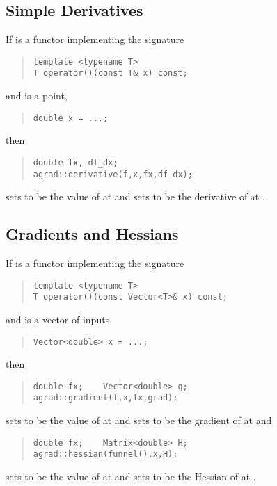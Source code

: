 \documentclass[10pt]{article}
\begin{document}
\subsection{Simple Derivatives}

If  is a functor implementing the signature
%
\begin{quote}
\begin{Verbatim}
template <typename T>
T operator()(const T& x) const;
\end{Verbatim}
\end{quote}
%
and  is a point,
%
\begin{quote}
\begin{Verbatim}
double x = ...;  
\end{Verbatim}
\end{quote}
%
then
%
\begin{quote}
\begin{Verbatim}
double fx, df_dx;  
agrad::derivative(f,x,fx,df_dx);
\end{Verbatim}
\end{quote}
%
sets  to be the value of  at  and
sets  to be the derivative of  at .


\subsection{Gradients and Hessians}

If  is a functor implementing the signature
%
\begin{quote}
\begin{Verbatim}
template <typename T>
T operator()(const Vector<T>& x) const;
\end{Verbatim}
\end{quote}
%
and  is a vector of inputs,
%
\begin{quote}
\begin{Verbatim}
Vector<double> x = ...;
\end{Verbatim}
\end{quote}
%
then
%
\begin{quote}
\begin{Verbatim}
double fx;    Vector<double> g;
agrad::gradient(f,x,fx,grad);
\end{Verbatim}
\end{quote}
%
sets  to be the value of  at  and sets
 to be the gradient of  at  and
%
\begin{quote}
\begin{Verbatim}
double fx;    Matrix<double> H;
agrad::hessian(funnel(),x,H);
\end{Verbatim}
\end{quote}
%
sets  to be the value of  at  and sets
 to be the Hessian of  at .
\end{document}
